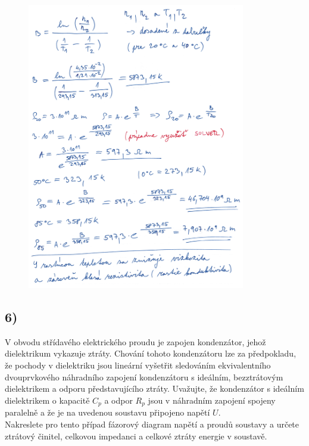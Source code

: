 \newpage

\begin{figure}[h]
    \centering
    \includegraphics*[width=0.85\textwidth]{images/diel5_1.jpg}
\end{figure}

\newpage


\subsection*{6)}
V obvodu střídavého elektrického proudu je zapojen kondenzátor, jehož dielektrikum vykazuje ztráty. Chování tohoto kondenzátoru lze za předpokladu, že pochody v dielektriku jsou lineární vyšetřit sledováním ekvivalentního dvouprvkového náhradního zapojení kondenzátoru s ideálním, bezztrátovým dielektrikem a odporu představujícího ztráty. Uvažujte, že kondenzátor s ideálním dielektrikem o kapacitě $C_p$ a odpor $R_p$ jsou v náhradním zapojení spojeny paralelně a že je na uvedenou soustavu připojeno napětí $U$. \\
Nakreslete pro tento případ fázorový diagram napětí a proudů soustavy a určete ztrátový činitel, celkovou impedanci a celkové ztráty energie v soustavě.

